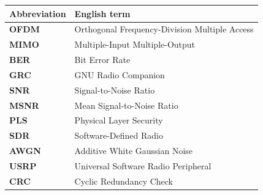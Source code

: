 \documentclass[a4paper, 12pt, openany]{book}
\begin{document}

\noindent\begin{tabular}{l|p{}}    %
  {\bf Abbreviation} & \bf English term \\ \hline
  {\bf OFDM} & Orthogonal Frequency-Division Multiple Access \\
  {\bf MIMO} & Multiple-Input Multiple-Output \\
  {\bf BER} & Bit Error Rate \\
  {\bf GRC} & GNU Radio Companion \\
  {\bf SNR} & Signal-to-Noise Ratio \\
  {\bf MSNR} & Mean Signal-to-Noise Ratio \\
  {\bf PLS} & Physical Layer Security \\
  {\bf SDR} & Software-Defined Radio \\
  {\bf AWGN} & Additive White Gaussian Noise \\
  {\bf USRP} & Universal Software Radio Peripheral \\
  {\bf CRC} & Cyclic Redundancy Check \\
\end{tabular}
\end{document}
